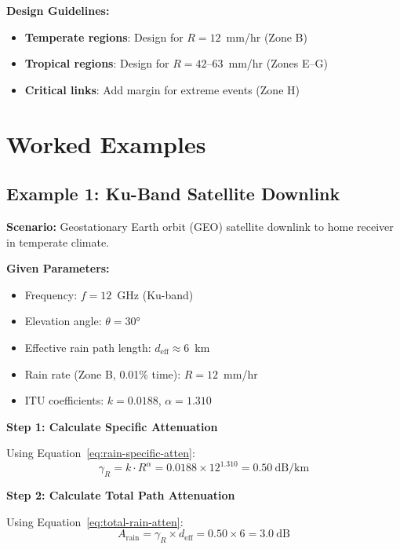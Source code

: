 \textbf{Design Guidelines:}
\begin{itemize}
\item \textbf{Temperate regions}: Design for $R = 12$~mm/hr (Zone B)
\item \textbf{Tropical regions}: Design for $R = 42$--63~mm/hr (Zones E--G)
\item \textbf{Critical links}: Add margin for extreme events (Zone H)
\end{itemize}

\section{Worked Examples}

\subsection{Example 1: Ku-Band Satellite Downlink}

\textbf{Scenario:} Geostationary Earth orbit (GEO) satellite downlink to home receiver in temperate climate.

\vspace{6pt}
\textbf{Given Parameters:}
\begin{itemize}
\item Frequency: $f = 12$~GHz (Ku-band)
\item Elevation angle: $\theta = 30°$
\item Effective rain path length: $d_{\text{eff}} \approx 6$~km
\item Rain rate (Zone B, 0.01\% time): $R = 12$~mm/hr
\item ITU coefficients: $k = 0.0188$, $\alpha = 1.310$
\end{itemize}

\vspace{6pt}
\textbf{Step 1: Calculate Specific Attenuation}

Using Equation~\ref{eq:rain-specific-atten}:
\begin{equation}
\gamma_R = k \cdot R^\alpha = 0.0188 \times 12^{1.310} = 0.50~\text{dB/km}
\end{equation}

\textbf{Step 2: Calculate Total Path Attenuation}

Using Equation~\ref{eq:total-rain-atten}:
\begin{equation}
A_{\text{rain}} = \gamma_R \times d_{\text{eff}} = 0.50 \times 6 = 3.0~\text{dB}
\end{equation}

